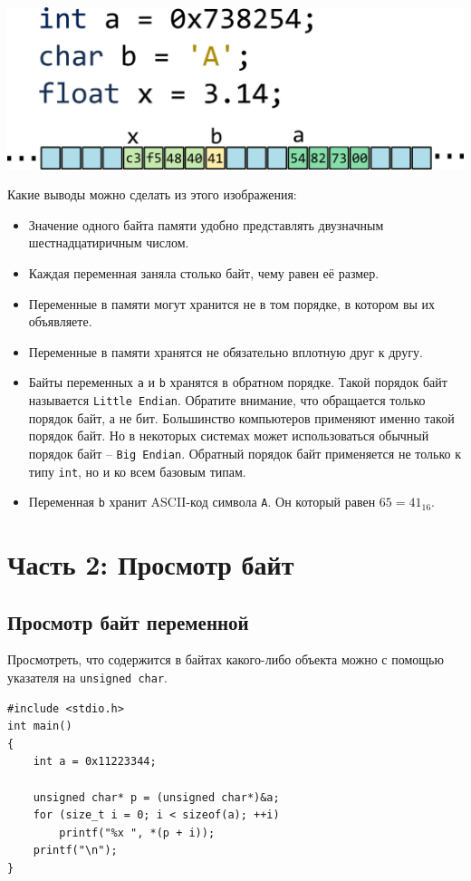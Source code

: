 \documentclass{article}
\begin{document}
\begin{center}
\includegraphics[scale=1]{../images/memory/memory_2_different_types.png}
\end{center}
Какие выводы можно сделать из этого изображения:
\begin{itemize}
\item Значение одного байта памяти удобно представлять двузначным шестнадцатиричным числом.
\item Каждая переменная заняла столько байт, чему равен её размер.
\item Переменные в памяти могут хранится не в том порядке, в котором вы их объявляете.
\item Переменные в памяти хранятся не обязательно вплотную друг к другу.
\item Байты переменных \texttt{a} и \texttt{b} хранятся в обратном порядке. Такой порядок байт называется \texttt{Little Endian}.  Обратите внимание, что обращается только порядок байт, а не бит. Большинство компьютеров применяют именно такой порядок байт. Но в некоторых системах может использоваться обычный порядок байт -- \texttt{Big Endian}. Обратный порядок байт применяется не только к типу \texttt{int}, но и ко всем базовым типам.
\item Переменная \texttt{b} хранит ASCII-код символа \texttt{A}. Он который равен $65 = 41_{16}$.
\end{itemize}


\newpage
\section*{Часть 2: Просмотр байт}
\subsection*{Просмотр байт переменной}
Просмотреть, что содержится в байтах какого-либо объекта можно с помощью указателя на \texttt{unsigned char}.

\begin{lstlisting} 
#include <stdio.h>
int main() 
{
    int a = 0x11223344;
    
    unsigned char* p = (unsigned char*)&a;
    for (size_t i = 0; i < sizeof(a); ++i)
        printf("%x ", *(p + i));
    printf("\n");
}
\end{lstlisting}
\end{document}
